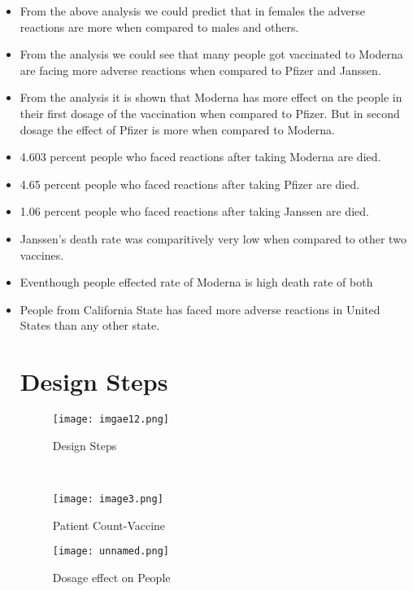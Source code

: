 \documentclass[conference]{IEEEtran}
\begin{document}
\begin{itemize}
\item From the above analysis we could predict that in females the adverse reactions are more when compared to males and others.\\


\item From the analysis we could see that many people got vaccinated to Moderna are facing more adverse reactions when compared to Pfizer and Janssen.
\item From the analysis it is shown that Moderna has more effect on the people in their first dosage of the vaccination when compared to Pfizer. But in second dosage the effect of Pfizer is more when compared to Moderna.

\item 4.603 percent people who faced reactions after taking Moderna are died.
\item 4.65 percent people who faced reactions after taking Pfizer are died.
\item 1.06 percent people who faced reactions after taking Janssen are died.
\item Janssen's death rate was comparitively very low when compared to other two vaccines.
\item Eventhough people effected rate of Moderna is high death rate of both 

\item People from California State has faced more adverse reactions in United States than any other state.

\section{Design Steps}

 \begin{figure}[htp]
    \centering
    \texttt{[image: imgae12.png]}
    \caption{Design Steps}
    \label{fig:galaxy}
\end{figure}\\



\begin{figure}[htp]
    \centering
    \texttt{[image: image3.png]}
    \caption{Patient Count-Vaccine}
    \label{fig:galaxy}
\end{figure}


\begin{figure}[htp]
    \centering
    \texttt{[image: unnamed.png]}
    \caption{Dosage effect on People}
    \label{fig:galaxy}
\end{figure}







\end{itemize}
\end{document}
